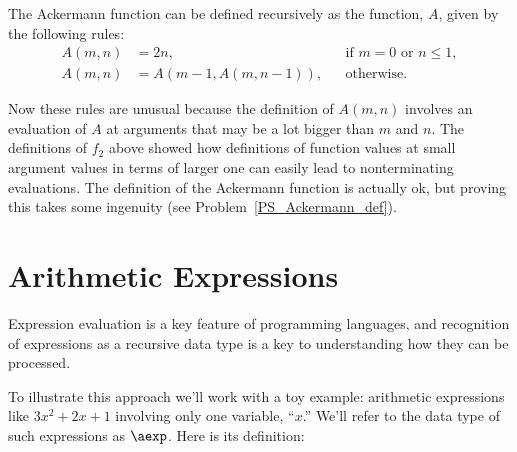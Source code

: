 The Ackermann function can be defined recursively as the function, $A$,
given by the following rules:
\begin{align}
A(m,n) &=  2n, &&\text{if $m=0$ or $n \le 1$},\label{Am0}\\ 
A(m,n) &=  A(m-1,A(m,n-1)), &&\text{otherwise}.\label{AA}
\end{align}

Now these rules are unusual because the definition of $A(m,n)$
involves an evaluation of $A$ at arguments that may be a lot bigger
than $m$ and $n$.  The definitions of $f_2$ above showed how
definitions of function values at small argument values in terms of
larger one can easily lead to nonterminating evaluations.  The
definition of the Ackermann function is actually ok, but proving this
takes some ingenuity (see Problem~\ref{PS_Ackermann_def}).
                            
\begin{problems}
\homeworkproblems
{}
\end{problems}

\section{Arithmetic Expressions}\label{aexp_sec}
Expression evaluation is a key feature of programming languages, and
recognition of expressions as a recursive data type is a key to
understanding how they can be processed.

To illustrate this approach we'll work with a toy example: arithmetic
expressions like $3x^2 + 2x + 1$ involving only one variable, ``$x$.''
We'll refer to the data type of such expressions as $\aexp$.  Here is its
definition:

